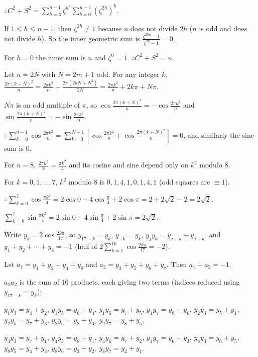   $\therefore C^2 + S^2 = \displaystyle\sum_{h = 0}^{n - 1}\zeta^{h^2}\sum_{b = 0}^{n - 1}\left(\zeta^{2h}\right)^b$.

  If $1\leq h\leq n - 1$, then $\zeta^{2h}\neq 1$ because $n$ does not divide $2h$ ($n$ is odd and does not divide $h$). So the inner
  geometric sum is $\frac{\zeta^{2hn} - 1}{\zeta^{2h} - 1} = 0$.

  For $h = 0$ the inner sum is $n$ and $\zeta^0 = 1$. $\therefore C^2 + S^2 = n$.
\item Let $n = 2N$ with $N = 2m + 1$ odd. For any integer $k$, $\frac{2\pi(k + N)^2}{n} = \frac{2\pi k^2}{n}
  + \frac{2\pi(2kN + N^2)}{2N} = \frac{2\pi k^2}{n} + 2k\pi + N\pi$.

  $N\pi$ is an odd multiple of $\pi$, so $\cos\frac{2\pi(k + N)^2}{n} = -\cos\frac{2\pi k^2}{n}$ and
  $\sin\frac{2\pi(k + N)^2}{n} = -\sin\frac{2\pi k^2}{n}$.

  $\therefore \displaystyle\sum_{k = 0}^{n - 1}\cos\frac{2\pi k^2}{n} = \sum_{k = 0}^{N - 1}\left[\cos\frac{2\pi
    k^2}{n} + \cos\frac{2\pi(k + N)^2}{n}\right] = 0$, and similarly the sine sum is $0$.

  For $n = 8$, $\frac{2\pi k^2}{8} = \frac{\pi k^2}{4}$ and its cosine and sine depend only on $k^2$ modulo $8$.

  For $k = 0, 1, \ldots, 7$, $k^2$ modulo $8$ is $0, 1, 4, 1, 0, 1, 4, 1$ (odd squares are $\equiv 1$).

  $\therefore \displaystyle\sum_{k = 0}^{7}\cos\frac{\pi k^2}{4} = 2\cos0 + 4\cos\frac{\pi}{4} + 2\cos\pi = 2 +
  2\sqrt{2} - 2 = 2\sqrt{2}$.

  $\displaystyle\sum_{k = 0}^{7}\sin\frac{\pi k^2}{4} = 2\sin0 + 4\sin\frac{\pi}{4} + 2\sin\pi = 2\sqrt{2}$.
\item Write $y_k = 2\cos\frac{2k\pi}{17}$, so $y_{17 - k} = y_k$, $y_{-k} = y_k$, $y_jy_k = y_{j + k} + y_{j - k}$,
  and $y_1 + y_2 + \cdots + y_8 = -1$ (half of $2\sum_{k = 1}^{16}\cos\frac{2k\pi}{17} = -2$).

  Let $a_1 = y_1 + y_2 + y_4 + y_8$ and $a_2 = y_3 + y_5 + y_6 + y_7$. Then $a_1 + a_2 = -1$.

  $a_1a_2$ is the sum of $16$ products, each giving two terms (indices reduced using $y_{17 - k} = y_k$):

  $y_1y_3 = y_4 + y_2$, $y_1y_5 = y_6 + y_4$, $y_1y_6 = y_7 + y_5$, $y_1y_7 = y_8 + y_6$, $y_2y_3 = y_5 + y_1$, $y_2y_5 =
  y_7 + y_3$, $y_2y_6 = y_8 + y_4$, $y_2y_7 = y_8 + y_5$,

  $y_4y_3 = y_7 + y_1$, $y_4y_5 = y_8 + y_1$, $y_4y_6 = y_7 + y_2$, $y_4y_7 = y_6 + y_3$, $y_8y_3 = y_6 + y_5$, $y_8y_5 =
  y_4 + y_3$, $y_8y_6 = y_3 + y_2$, $y_8y_7 = y_2 + y_1$.

